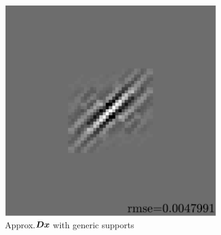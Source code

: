 \begin{figure}[!ht]
\begin{subfigure}[b]{0.085\textwidth}
	\caption{}\label{fig_learnsupp_branch-generic_tree}
\end{subfigure}
\begin{subfigure}[b]{0.39\textwidth}\centering
\includegraphics[width=\textwidth]{figures/exple-better-support/xp_128x128_sc2_angl1_K3_S3_node4classic_approx.pdf}
\caption{Approx.\@ $\bm{D}\bm{x}$ with generic supports}\label{fig_learnsupp_branch-generic_approx}
\end{subfigure}
\begin{subfigure}[b]{0.085\textwidth}\centering

\end{subfigure}
\end{figure}
